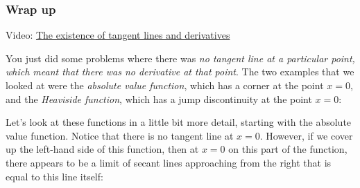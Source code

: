 \documentclass[pdftex, brazil, 12pt, twoside]{article}
\begin{document}
\subsubsection{Wrap up}
\label{u1-geometric-existence-of-tangent-and-derivatives}

Video: \href{https://www.youtube.com/watch?v=2Ms02JiZ6vQ}{The existence of tangent
  lines and derivatives}

You just did some problems where there
was \emph{no tangent line at a particular point, which
meant that there was no derivative at that point}.
The two examples that we looked at
were the \emph{absolute value function},
which has a corner at the point $x= 0$,
and the \emph{Heaviside function}, which
has a jump discontinuity at the point $x = 0$:

\begin{figure}[H]
  \begin{center}
  \end{center}
\end{figure}
  
Let's look at these functions in a little bit more detail,
starting with the absolute value function.
Notice that there is no tangent line at $x=0$.
However, if we cover up the left-hand side
of this function, then at $x=0$
on this part of the function, there
appears to be a limit of secant lines approaching
from the right that is equal to this line itself:
\end{document}
